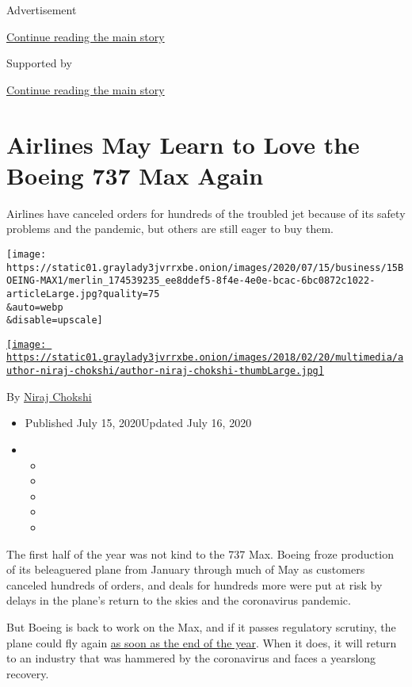 Advertisement

\protect\hyperlink{after-top}{Continue reading the main story}

Supported by

\protect\hyperlink{after-sponsor}{Continue reading the main story}

\hypertarget{airlines-may-learn-to-love-the-boeing-737-max-again}{%
\section{Airlines May Learn to Love the Boeing 737 Max
Again}\label{airlines-may-learn-to-love-the-boeing-737-max-again}}

Airlines have canceled orders for hundreds of the troubled jet because
of its safety problems and the pandemic, but others are still eager to
buy them.

\texttt{[image: https://static01.graylady3jvrrxbe.onion/images/2020/07/15/business/15BOEING-MAX1/merlin\_174539235\_ee8ddef5-8f4e-4e0e-bcac-6bc0872c1022-articleLarge.jpg?quality=75\\\&auto=webp\\\&disable=upscale]}

\href{https://www.nytimes3xbfgragh.onion/by/niraj-chokshi}{\texttt{[image: https://static01.graylady3jvrrxbe.onion/images/2018/02/20/multimedia/author-niraj-chokshi/author-niraj-chokshi-thumbLarge.jpg]}}

By \href{https://www.nytimes3xbfgragh.onion/by/niraj-chokshi}{Niraj
Chokshi}

\begin{itemize}
\item
  Published July 15, 2020Updated July 16, 2020
\item
  \begin{itemize}
  \item
  \item
  \item
  \item
  \item
  \end{itemize}
\end{itemize}

The first half of the year was not kind to the 737 Max. Boeing froze
production of its beleaguered plane from January through much of May as
customers canceled hundreds of orders, and deals for hundreds more were
put at risk by delays in the plane's return to the skies and the
coronavirus pandemic.

But Boeing is back to work on the Max, and if it passes regulatory
scrutiny, the plane could fly again
\href{https://www.nytimes3xbfgragh.onion/2020/07/02/travel/boeings-737-max-flying.html}{as
soon as the end of the year}. When it does, it will return to an
industry that was hammered by the coronavirus and faces a yearslong
recovery.

